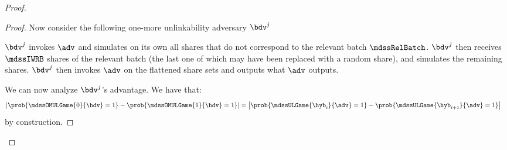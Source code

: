 \begin{proof}
\begin{proof}
		Now consider the following one-more unlinkability adversary $\bdv^j$
		\begin{pcvstack}[center, space=1em]

		\end{pcvstack}
		$\bdv^j$ invokes $\adv$ and simulates on its own all shares that do not correspond to the relevant batch $\mdssRelBatch$.
		$\bdv^j$ then receives $\mdssIWRB$ shares of the relevant batch (the last one of which may have been replaced with a random share), and simulates the remaining shares.
		$\bdv^j$ then invokes $\adv$ on the flattened share sets and outputs what $\adv$ outputs.

		We can now analyze $\bdv^j$'s advantage. We have that:
		\begin{align*}
			\left| \prob{\mdssOMULGame{0}{\bdv} = 1} - \prob{\mdssOMULGame{1}{\bdv} = 1} \right| & =
			\left| \prob{\mdssULGame{\hyb_i}{\adv} =1} - \prob{\mdssULGame{\hyb_{i + 1}}{\adv} = 1} \right|
		\end{align*}
		by construction.


\end{proof}
\end{proof}
